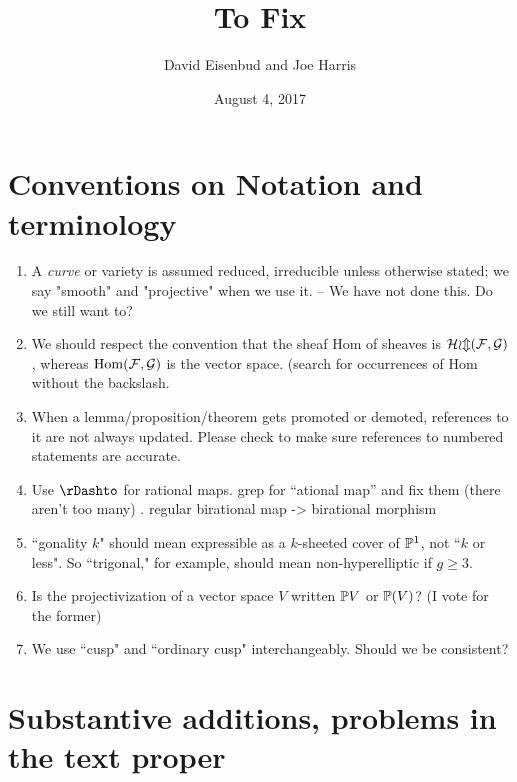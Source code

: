 \documentclass[12pt, leqno]{book}
\date{August 4, 2017}
\title{To Fix}
\author{David Eisenbud and Joe Harris }
\begin{document}
\maketitle

\setlength{\parskip}{5pt}

 
 \section{Conventions on Notation and terminology}
\begin{enumerate}

\item A \emph{curve} or variety is assumed  reduced, irreducible unless otherwise stated; we say "smooth" and "projective" when we use it. -- We have not done this. Do we still want to?

\item We should respect the convention that the sheaf Hom of sheaves is
$\cal H om({\mathcal F},{\mathcal G})$, whereas $\operatorname{Hom}({\mathcal F},{\mathcal G})$ is the vector space. (search for occurrences of Hom without the backslash.

\item When a lemma/proposition/theorem gets promoted or demoted, references to it are not always updated. Please check to make sure references to numbered statements are accurate. 

\item Use $\rDashto$ for rational maps. grep for ``ational map'' and fix them (there aren't too many) . regular birational map -> birational morphism

\item ``gonality $k$" should mean expressible as a $k$-sheeted cover of ${\mathbb P}^1$, not ``$k$ or less". So ``trigonal," for example, should mean non-hyperelliptic if $g \geq 3$.


\item Is the projectivization of a vector space $V$ written ${\mathbb P} V$ or ${\mathbb P}(V)$? (I vote for the former)

\item We use ``cusp" and ``ordinary cusp" interchangeably. Should we be consistent?


\end{enumerate}

 

\section{Substantive additions, problems in the text proper}
\end{document}
